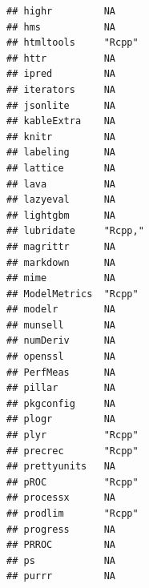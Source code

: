 \documentclass[]{article}
\begin{document}
\begin{verbatim}
## highr         NA                                                   
## hms           NA                                                   
## htmltools     "Rcpp"                                               
## httr          NA                                                   
## ipred         NA                                                   
## iterators     NA                                                   
## jsonlite      NA                                                   
## kableExtra    NA                                                   
## knitr         NA                                                   
## labeling      NA                                                   
## lattice       NA                                                   
## lava          NA                                                   
## lazyeval      NA                                                   
## lightgbm      NA                                                   
## lubridate     "Rcpp,"                                              
## magrittr      NA                                                   
## markdown      NA                                                   
## mime          NA                                                   
## ModelMetrics  "Rcpp"                                               
## modelr        NA                                                   
## munsell       NA                                                   
## numDeriv      NA                                                   
## openssl       NA                                                   
## PerfMeas      NA                                                   
## pillar        NA                                                   
## pkgconfig     NA                                                   
## plogr         NA                                                   
## plyr          "Rcpp"                                               
## precrec       "Rcpp"                                               
## prettyunits   NA                                                   
## pROC          "Rcpp"                                               
## processx      NA                                                   
## prodlim       "Rcpp"                                               
## progress      NA                                                   
## PRROC         NA                                                   
## ps            NA                                                   
## purrr         NA                                                   

\end{verbatim}
\end{document}
